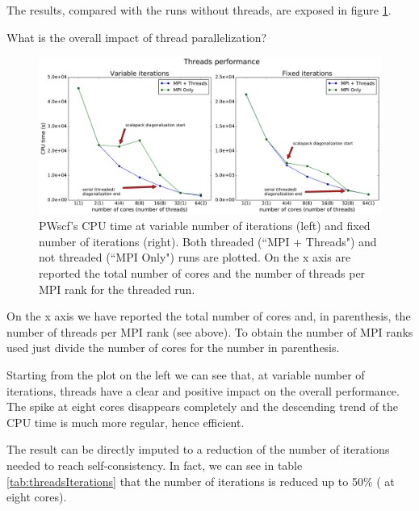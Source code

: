 \documentclass[a4paper,12pt]{article}
\begin{document}
The results, compared with the runs without threads, are exposed in figure \ref{fig:threadsOverall}.

\newpage 

\begin{center}
\begin{framed}
What is the overall impact of thread parallelization?
\end{framed}
\end{center}


\begin{figure}[hhh!]
\centerline{ \includegraphics[width=1.2\linewidth]{threads_overall.pdf}	}
	\caption{PWscf's CPU time at variable number of iterations (left) and fixed number of iterations (right). Both threaded (``MPI + Threads") and not threaded (``MPI Only") runs are plotted. On the x axis are reported the total number of cores and the number of threads per MPI rank for the threaded run.}
	\label{fig:threadsOverall}

\end{figure}

On the x axis we have reported the total number of cores and, in parenthesis, the number of threads per MPI rank (see above).
To obtain the number of MPI ranks used just divide the number of cores for the number in parenthesis.

Starting from the plot on the left we can see that, at variable number of iterations, threads have a clear and positive impact on the overall performance.
The spike at eight cores disappears completely and the descending trend of the CPU time is much more regular, hence efficient.

The result can be directly imputed to a reduction of the number of iterations needed to reach self-consistency.
In fact, we can see in table \ref{tab:threadsIterations} that the number of iterations is reduced up to 50\% ( at eight cores).
\end{document}
